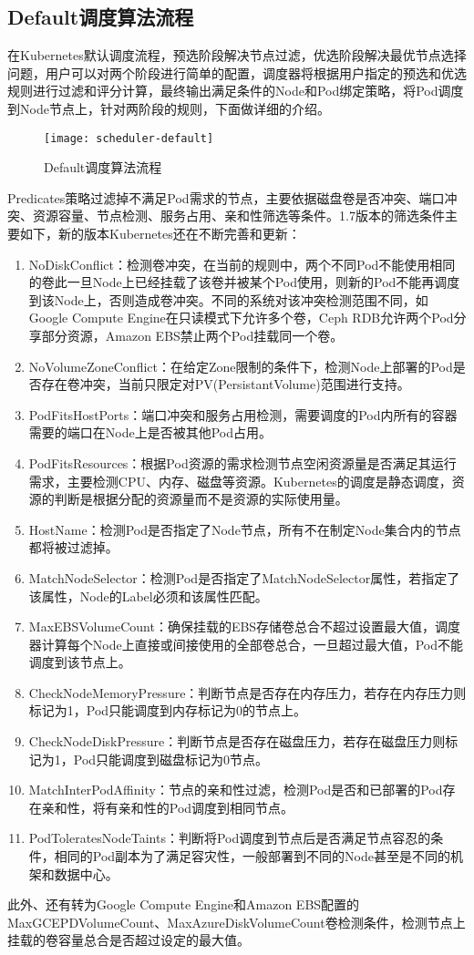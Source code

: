 \subsection{Default调度算法流程}
在Kubernetes默认调度流程，预选阶段解决节点过滤，优选阶段解决最优节点选择问题，用户可以对两个阶段进行简单的配置，调度器将根据用户指定的预选和优选规则进行过滤和评分计算，最终输出满足条件的Node和Pod绑定策略，将Pod调度到Node节点上，针对两阶段的规则，下面做详细的介绍。
\begin{figure}[H] %
	\centering
	\texttt{[image: scheduler-default]}
	\caption{Default调度算法流程}
\end{figure}
Predicates策略过滤掉不满足Pod需求的节点，主要依据磁盘卷是否冲突、端口冲突、资源容量、节点检测、服务占用、亲和性筛选等条件。1.7版本的筛选条件主要如下，新的版本Kubernetes还在不断完善和更新：
\begin{enumerate}[(1)]
	\item NoDiskConflict：检测卷冲突，在当前的规则中，两个不同Pod不能使用相同的卷此一旦Node上已经挂载了该卷并被某个Pod使用，则新的Pod不能再调度到该Node上，否则造成卷冲突。不同的系统对该冲突检测范围不同，如Google Compute Engine在只读模式下允许多个卷，Ceph RDB允许两个Pod分享部分资源，Amazon EBS禁止两个Pod挂载同一个卷。
	\item NoVolumeZoneConflict：在给定Zone限制的条件下，检测Node上部署的Pod是否存在卷冲突，当前只限定对PV(PersistantVolume)范围进行支持。
	\item PodFitsHostPorts：端口冲突和服务占用检测，需要调度的Pod内所有的容器需要的端口在Node上是否被其他Pod占用。
	\item PodFitsResources：根据Pod资源的需求检测节点空闲资源量是否满足其运行需求，主要检测CPU、内存、磁盘等资源。Kubernetes的调度是静态调度，资源的判断是根据分配的资源量而不是资源的实际使用量。
	\item HostName：检测Pod是否指定了Node节点，所有不在制定Node集合内的节点都将被过滤掉。
	\item MatchNodeSelector：检测Pod是否指定了MatchNodeSelector属性，若指定了该属性，Node的Label必须和该属性匹配。
	\item MaxEBSVolumeCount：确保挂载的EBS存储卷总合不超过设置最大值，调度器计算每个Node上直接或间接使用的全部卷总合，一旦超过最大值，Pod不能调度到该节点上。
	\item CheckNodeMemoryPressure：判断节点是否存在内存压力，若存在内存压力则标记为1，Pod只能调度到内存标记为0的节点上。
	\item CheckNodeDiskPressure：判断节点是否存在磁盘压力，若存在磁盘压力则标记为1，Pod只能调度到磁盘标记为0节点。
	\item MatchInterPodAffinity：节点的亲和性过滤，检测Pod是否和已部署的Pod存在亲和性，将有亲和性的Pod调度到相同节点。
	\item PodToleratesNodeTaints：判断将Pod调度到节点后是否满足节点容忍的条件，相同的Pod副本为了满足容灾性，一般部署到不同的Node甚至是不同的机架和数据中心。
\end{enumerate}
此外、还有转为Google Compute Engine和Amazon EBS配置的MaxGCEPDVolumeCount、MaxAzureDiskVolumeCount卷检测条件，检测节点上挂载的卷容量总合是否超过设定的最大值。

